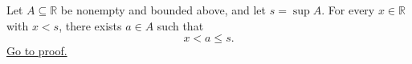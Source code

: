 \begin{lemma}
\label{lem:supremum-strict-upper-approximation}
Let $A\subseteq\mathbb{R}$ be nonempty and bounded above, and let
$s=\sup A$.  For every $x\in\mathbb{R}$ with $x<s$, there exists
$a\in A$ such that
\[
x<a\le s.
\]
\hyperref[prf:supremum-strict-upper-approximation]{Go to proof.}
\end{lemma}
